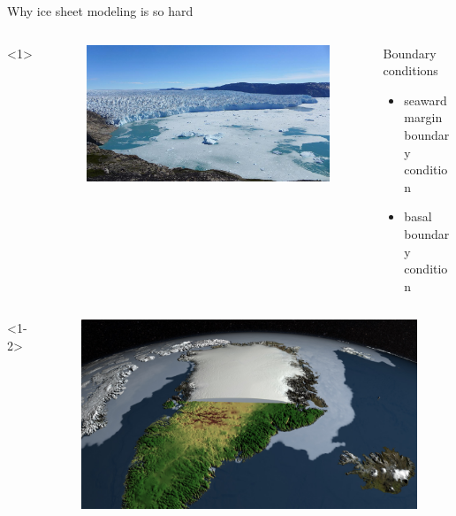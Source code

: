 \documentclass[hide notes,intlimits,unknownkeysallowed]{beamer}
\begin{document}
\begin{frame}{Why ice sheet modeling is so hard}
    \begin{columns}[c]<1>
      \begin{column}{.28\linewidth}
        \begin{figure}
          \includegraphics[width=\linewidth]{storeglacier}
        \end{figure}
      \end{column}
      \begin{column}{.67\linewidth}
        \begin{block}{Boundary conditions}
        \begin{itemize}
        \item seaward margin boundary condition
        \item basal boundary condition
        \end{itemize}
      \end{block}
      \end{column}
    \end{columns}
    \begin{columns}[c]<1-2>
      \begin{column}{.28\linewidth}
        \begin{figure}
          \includegraphics[width=\linewidth]{canale_grande_V05}

\end{figure}
\end{column}
\end{columns}
\end{frame}
\end{document}
